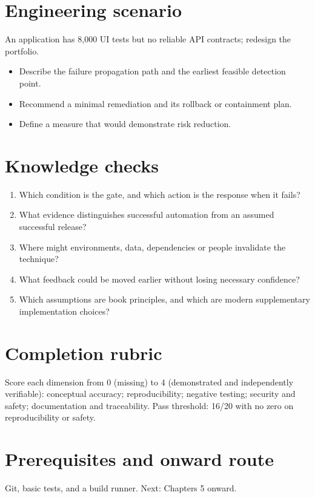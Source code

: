 \documentclass[10pt,letterpaper]{article}
\begin{document}
\section{Engineering scenario}
An application has 8,000 UI tests but no reliable API contracts; redesign the portfolio.

\begin{itemize}
\item Describe the failure propagation path and the earliest feasible detection point.
\item Recommend a minimal remediation and its rollback or containment plan.
\item Define a measure that would demonstrate risk reduction.
\end{itemize}

\section{Knowledge checks}
\begin{enumerate}
\item Which condition is the gate, and which action is the response when it fails?
\item What evidence distinguishes successful automation from an assumed successful release?
\item Where might environments, data, dependencies or people invalidate the technique?
\item What feedback could be moved earlier without losing necessary confidence?
\item Which assumptions are book principles, and which are modern supplementary implementation choices?
\end{enumerate}

\section{Completion rubric}
Score each dimension from 0 (missing) to 4 (demonstrated and independently verifiable): conceptual accuracy; reproducibility; negative testing; security and safety; documentation and traceability. Pass threshold: 16/20 with no zero on reproducibility or safety.


\section{Prerequisites and onward route}
Git, basic tests, and a build runner. Next: Chapters 5 onward.
\end{document}
